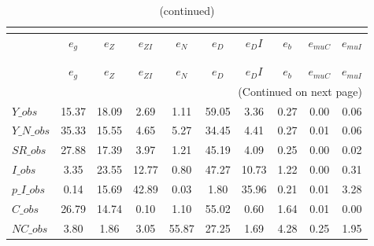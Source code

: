  
\begin{center}
\begin{longtable}{lccccccccc} 
\caption{VARIANCE DECOMPOSITION (in percent)}\\
 \label{Table:th_var_decomp_uncond}\\
\toprule 
$               $	 & 	 $        {e_g}$	 & 	 $        {e_Z}$	 & 	 $     {e_{ZI}}$	 & 	 $        {e_N}$	 & 	 $        {e_D}$	 & 	 $       {e_DI}$	 & 	 $        {e_b}$	 & 	 $    {e_{muC}}$	 & 	 $    {e_{muI}}$\\
\midrule \endfirsthead 
\caption{(continued)}\\
 \toprule \\ 
$               $	 & 	 $        {e_g}$	 & 	 $        {e_Z}$	 & 	 $     {e_{ZI}}$	 & 	 $        {e_N}$	 & 	 $        {e_D}$	 & 	 $       {e_DI}$	 & 	 $        {e_b}$	 & 	 $    {e_{muC}}$	 & 	 $    {e_{muI}}$\\
\midrule \endhead 
\midrule \multicolumn{10}{r}{(Continued on next page)} \\ \bottomrule \endfoot 
\bottomrule \endlastfoot 
$Y\_obs         $	 & 	        15.37	 & 	        18.09	 & 	         2.69	 & 	         1.11	 & 	        59.05	 & 	         3.36	 & 	         0.27	 & 	         0.00	 & 	         0.06 \\ 
$Y\_N\_obs      $	 & 	        35.33	 & 	        15.55	 & 	         4.65	 & 	         5.27	 & 	        34.45	 & 	         4.41	 & 	         0.27	 & 	         0.01	 & 	         0.06 \\ 
$SR\_obs        $	 & 	        27.88	 & 	        17.39	 & 	         3.97	 & 	         1.21	 & 	        45.19	 & 	         4.09	 & 	         0.25	 & 	         0.00	 & 	         0.02 \\ 
$I\_obs         $	 & 	         3.35	 & 	        23.55	 & 	        12.77	 & 	         0.80	 & 	        47.27	 & 	        10.73	 & 	         1.22	 & 	         0.00	 & 	         0.31 \\ 
$p\_I\_obs      $	 & 	         0.14	 & 	        15.69	 & 	        42.89	 & 	         0.03	 & 	         1.80	 & 	        35.96	 & 	         0.21	 & 	         0.01	 & 	         3.28 \\ 
$C\_obs         $	 & 	        26.79	 & 	        14.74	 & 	         0.10	 & 	         1.10	 & 	        55.02	 & 	         0.60	 & 	         1.64	 & 	         0.01	 & 	         0.00 \\ 
$NC\_obs        $	 & 	         3.80	 & 	         1.86	 & 	         3.05	 & 	        55.87	 & 	        27.25	 & 	         1.69	 & 	         4.28	 & 	         0.25	 & 	         1.95 \\ 

\end{longtable}
\end{center}
